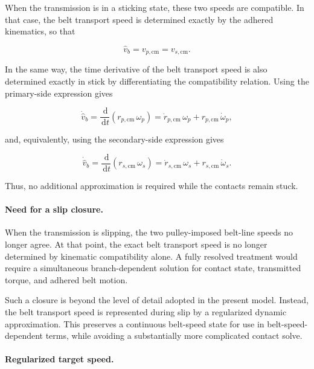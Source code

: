 \documentclass[11pt]{article}
\numberwithin{equation}{section}
\newcommand{\dd}{\,\mathrm{d}}
\begin{document}
When the transmission is in a sticking state, these two speeds are compatible.
In that case, the belt transport speed is determined exactly by the adhered
kinematics, so that

\begin{equation}
\hat{v}_b = v_{p,\mathrm{cm}} = v_{s,\mathrm{cm}}.
\label{eq:vb_stick_exact}
\end{equation}

In the same way, the time derivative of the belt transport speed is also
determined exactly in stick by differentiating the compatibility relation.
Using the primary-side expression gives

\begin{equation}
\dot{\hat{v}}_b
=
\frac{\dd}{\dd t}\!\left(r_{p,\mathrm{cm}}\,\omega_p\right)
=
\dot r_{p,\mathrm{cm}}\,\omega_p
+
r_{p,\mathrm{cm}}\,\dot\omega_p,
\label{eq:vb_dot_stick_primary}
\end{equation}

and, equivalently, using the secondary-side expression gives

\begin{equation}
\dot{\hat{v}}_b
=
\frac{\dd}{\dd t}\!\left(r_{s,\mathrm{cm}}\,\omega_s\right)
=
\dot r_{s,\mathrm{cm}}\,\omega_s
+
r_{s,\mathrm{cm}}\,\dot\omega_s.
\label{eq:vb_dot_stick_secondary}
\end{equation}

Thus, no additional approximation is required while the contacts remain stuck.

\paragraph{Need for a slip closure.}

When the transmission is slipping, the two pulley-imposed belt-line speeds no
longer agree.
At that point, the exact belt transport speed is no longer determined by
kinematic compatibility alone.
A fully resolved treatment would require a simultaneous branch-dependent
solution for contact state, transmitted torque, and adhered belt motion.

Such a closure is beyond the level of detail adopted in the present model.
Instead, the belt transport speed is represented during slip by a regularized
dynamic approximation.
This preserves a continuous belt-speed state for use in belt-speed-dependent
terms, while avoiding a substantially more complicated contact solve.

\paragraph{Regularized target speed.}
\end{document}

